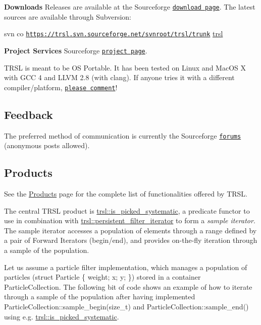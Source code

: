 \begin{DoxyDescription}
\item[{\bfseries Downloads}  ]Releases are available at the Sourceforge \href{http://sourceforge.net/project/platformdownload.php?group_id=212585}{\tt download page}. The latest sources are available through Subversion:\par
{\ttfamily svn co \href{https://trsl.svn.sourceforge.net/svnroot/trsl/trunk}{\tt https://trsl.svn.sourceforge.net/svnroot/trsl/trunk} \hyperlink{namespacetrsl}{trsl}}


\item[{\bfseries Project Services}  ]Sourceforge \href{http://sourceforge.net/projects/trsl}{\tt project page}.


\end{DoxyDescription}

TRSL is meant to be OS Portable. It has been tested on Linux and MacOS X with GCC 4 and LLVM 2.8 (with clang). If anyone tries it with a different compiler/platform, \href{http://sourceforge.net/forum/?group_id=212585}{\tt please comment}!\hypertarget{index_index_feedback}{}\subsection{Feedback}\label{index_index_feedback}
The preferred method of communication is currently the Sourceforge \href{http://sourceforge.net/forum/?group_id=212585}{\tt forums} (anonymous posts allowed).\hypertarget{index_index_products}{}\subsection{Products}\label{index_index_products}
See the \hyperlink{group__products}{Products} page for the complete list of functionalities offered by TRSL.

The central TRSL product is \hyperlink{classtrsl_1_1is__picked__systematic}{trsl::is\_\-picked\_\-systematic}, a predicate functor to use in combination with \hyperlink{classtrsl_1_1persistent__filter__iterator}{trsl::persistent\_\-filter\_\-iterator} to form a {\itshape sample iterator\/}. The sample iterator accesses a population of elements through a range defined by a pair of Forward Iterators (begin/end), and provides on-\/the-\/fly iteration through a sample of the population.

Let us assume a particle filter implementation, which manages a population of particles ({\ttfamily struct Particle \{ weight; x; y; \}}) stored in a container {\ttfamily ParticleCollection}. The following bit of code shows an example of how to iterate through a sample of the population after having implemented {\ttfamily ParticleCollection::sample\_\-begin(size\_\-t)} and {\ttfamily ParticleCollection::sample\_\-end()} using e.g. \hyperlink{classtrsl_1_1is__picked__systematic}{trsl::is\_\-picked\_\-systematic}.


